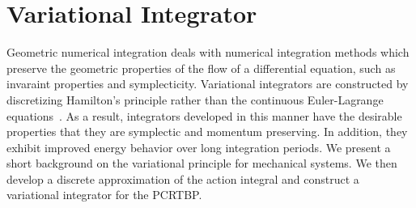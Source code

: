 \documentclass[preprint]{elsarticle}
\begin{document}
\section{Variational Integrator}\label{sec:discrete_var}
Geometric numerical integration deals with numerical integration methods which preserve the geometric properties of the flow of a differential equation, such as invaraint properties and symplecticity.
Variational integrators are constructed by discretizing Hamilton's principle rather than the continuous Euler-Lagrange equations~\cite{marsden2001}.
As a result, integrators developed in this manner have the desirable properties that they are symplectic and momentum preserving.
In addition, they exhibit improved energy behavior over long integration periods.
We present a short background on the variational principle for mechanical systems. 
We then develop a discrete approximation of the action integral and construct a variational integrator for the PCRTBP.
\end{document}
